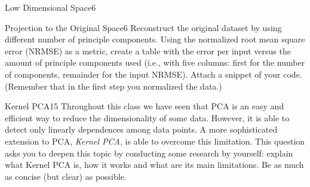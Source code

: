 \begin{questions}
\begin{question}{Low Dimensional Space}{6}
\begin{answer}\end{answer}

\end{question}


\begin{question}{Projection to the Original Space}{6}
Reconstruct the original dataset by using different number of principle components. Using the normalized root mean square error (NRMSE) as a metric, create a table with the error per input versus the amount of principle components used (i.e., with five columns: first for the number of components, remainder for the input NRMSE).
Attach a snippet of your code.
(Remember that in the first step you normalized the data.)

\begin{answer}\end{answer}
\end{question}

\begin{question}[bonus]{Kernel PCA}{15}
Throughout this class we have seen that PCA is an easy and efficient way to reduce the dimensionality of some data. However, it is able to detect only linearly dependences among data points. A more sophisticated extension to PCA, \emph{Kernel PCA}, is able to overcome this limitation. 
This question asks you to deepen this topic by conducting some research by yourself: explain what Kernel PCA is, how it works and what are its main limitations. Be as much as concise (but clear) as possible.

\begin{answer}\end{answer}

\end{question}

\end{questions}
